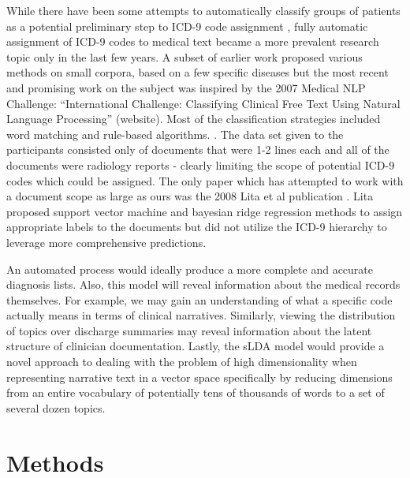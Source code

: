 \documentclass{article}
\begin{document}
While there have been some attempts to automatically classify groups of patients as a potential preliminary step to ICD-9 code assignment \citep{Ruch2008, FreitasJunior2006, RibeiroNeto2001, Brown2006}, fully automatic assignment of ICD-9 codes to medical text became a more prevalent research topic only in the last few years. A subset of earlier work proposed various methods on small corpora, based on a few specific diseases \citep{Rao2003} but the most recent and promising work on the subject was inspired by the 2007 Medical NLP Challenge: “International Challenge: Classifying Clinical Free Text Using Natural Language Processing” (website). Most of the classification strategies included word matching and rule-based algorithms. \citep{Goldstein2007, Crammer2007, Farkas2008}.  The data set given to the participants consisted only of documents that were 1-2 lines each and all of the documents were radiology reports - clearly limiting the scope of potential ICD-9 codes which could be assigned. The only paper which has attempted to work with a document scope as large as ours was the 2008 Lita et al publication \citep{Lita2008}.  Lita proposed support vector machine and bayesian ridge regression methods to assign appropriate labels to the documents but did not utilize the ICD-9 hierarchy to leverage more comprehensive predictions.

An automated process would ideally produce a more complete and accurate diagnosis lists.  Also, this model will reveal information about the medical records themselves.  For example, we may gain an understanding of what a specific code actually means in terms of clinical narratives.  Similarly, viewing the distribution of topics over discharge summaries may reveal information about the latent structure of clinician documentation.  Lastly, the sLDA model would provide a novel approach to dealing with the problem of high dimensionality when representing narrative text in a vector space specifically by reducing dimensions from an entire vocabulary of potentially tens of thousands of words to a set of several dozen topics.  


\section{Methods}
\end{document}
